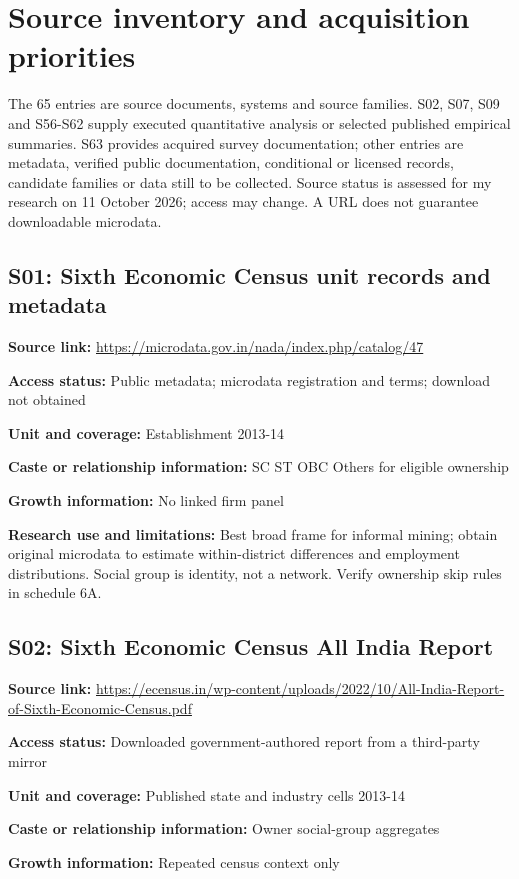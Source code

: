 \documentclass[11pt,a4paper]{report}
\begin{document}
\chapter{Source inventory and acquisition priorities}
The 65 entries are source documents, systems and source families. S02, S07, S09 and S56-S62 supply executed quantitative analysis or selected published empirical summaries. S63 provides acquired survey documentation; other entries are metadata, verified public documentation, conditional or licensed records, candidate families or data still to be collected. Source status is assessed for my research on 11 October 2026; access may change. A URL does not guarantee downloadable microdata.
\section{S01: Sixth Economic Census unit records and metadata}\hypertarget{S01}{}
\textbf{Source link:} \url{https://microdata.gov.in/nada/index.php/catalog/47}

\textbf{Access status:} Public metadata; microdata registration and terms; download not obtained

\textbf{Unit and coverage:} Establishment 2013-14

\textbf{Caste or relationship information:} SC ST OBC Others for eligible ownership

\textbf{Growth information:} No linked firm panel

\textbf{Research use and limitations:} Best broad frame for informal mining; obtain original microdata to estimate within-district differences and employment distributions. Social group is identity, not a network. Verify ownership skip rules in schedule 6A.

\section{S02: Sixth Economic Census All India Report}\hypertarget{S02}{}
\textbf{Source link:} \url{https://ecensus.in/wp-content/uploads/2022/10/All-India-Report-of-Sixth-Economic-Census.pdf}

\textbf{Access status:} Downloaded government-authored report from a third-party mirror

\textbf{Unit and coverage:} Published state and industry cells 2013-14

\textbf{Caste or relationship information:} Owner social-group aggregates

\textbf{Growth information:} Repeated census context only
\end{document}
